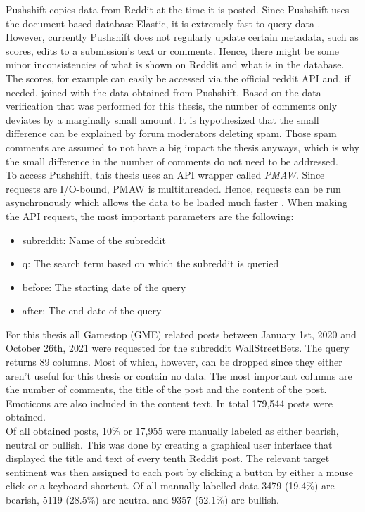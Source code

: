 \documentclass[11pt, a4paper]{article}
\begin{document}
Pushshift copies data from Reddit at the time it is posted. Since Pushshift uses the document-based database Elastic, it is extremely fast to query data \citep{elastic2015}. However, currently Pushshift does not regularly update certain metadata, such as scores, edits to a submission’s text or comments. Hence, there might be some minor inconsistencies of what is shown on Reddit and what is in the database. The scores, for example can easily be accessed via the official reddit API and, if needed, joined with the data obtained from Pushshift. Based on the data verification that was performed for this thesis, the number of comments only deviates by a marginally small amount. It is hypothesized that the small difference can be explained by forum moderators deleting spam. Those spam comments are assumed to not have a big impact the thesis anyways, which is why the small difference in the number of comments do not need to be addressed. \\
To access Pushshift, this thesis uses an API wrapper called \emph{PMAW}. Since requests are I/O-bound, PMAW is multithreaded. Hence, requests can be run asynchronously which allows the data to be loaded much faster \citep{pmaw2021}.
When making the API request, the most important parameters are the following:
\begin{itemize}
    \item subreddit: Name of the subreddit
    \item q: The search term based on which the subreddit is queried
    \item before: The starting date of the query
    \item after: The end date of the query
\end{itemize}

For this thesis all Gamestop (GME) related posts between January 1st, 2020 and October 26th, 2021 were requested for the subreddit WallStreetBets. 
The query returns 89 columns. Most of which, however, can be dropped since they either aren’t useful for this thesis or contain no data. 
The most important columns are the number of comments, the title of the post and the content of the post. 
Emoticons are also included in the content text. In total 179,544 posts were obtained.\\
Of all obtained posts, 10\% or 17,955 were manually labeled as either bearish, neutral or bullish. This was done by creating a graphical user interface that displayed the title and
text of every tenth Reddit post. The relevant target sentiment was then assigned to each post by clicking a button by either a mouse click or a keyboard shortcut. Of all manually labelled data
3479 (19.4\%) are bearish, 5119 (28.5\%) are neutral and 9357 (52.1\%) are bullish.
\end{document}
